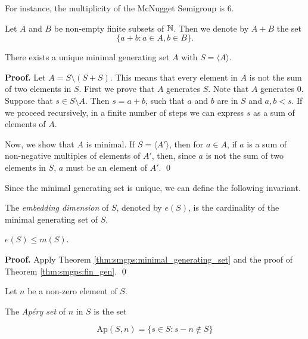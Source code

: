 For instance, the multiplicity of the McNugget Semigroup is 6. \par

Let $A$ and $B$ be non-empty finite subsets of $\mathbb{N}$. Then we denote by $A + B$ the set \[\{a + b : a \in A, b \in B\}.\] 

\begin{theorem}\label{thm:smgps:minimal_generating_set}
     There exists a unique minimal generating set $A$ with $S = \langle A \rangle$.
\end{theorem}

\textbf{Proof. } Let $A = S \setminus(S + S)$. This means that every element in $A$ is not the sum of two elements in $S$. First we prove that $A$ generates $S$. Note that $A$ generates 0. Suppose that $s\in S \setminus A$. Then $s = a + b$, such that $a$ and $b$ are in $S$ and $a, b < s$. If we proceed recursively, in a finite number of steps we can express $s$ as a sum of elements of $A$. \par

Now, we show that $A$ is minimal. If $S = \langle A' \rangle$, then for $a \in A$, if $a$ is a sum of non-negative multiples of elements of $A'$, then, since $a$ is not the sum of two elements in $S$, $a$ must be an element of $A'$. \qed \par

Since the minimal generating set is unique, we can define the following invariant.\par

\begin{definition}\label{def:smgps:embedding_dim}
    The \textit{embedding dimension} of $S$, denoted by $e(S)$, is the cardinality of the minimal generating set of $S$.
\end{definition}

\begin{corollary}\label{cor:smgps:embedding_dim}
    $e(S) \leq m(S)$.
\end{corollary}
\textbf{Proof. } Apply Theorem \ref{thm:smgps:minimal_generating_set} and the proof of Theorem \ref{thm:smgps:fin_gen}. \qed \par

Let $n$ be a non-zero element of $S$. \par

\begin{definition}\label{def:smgps:aperyset}
    The \textit{Ap\'ery set} of $n$ in $S$ is the set
\end{definition}
\[\mathrm{Ap}(S, n) = \{s \in S : s - n \notin S\}\]

